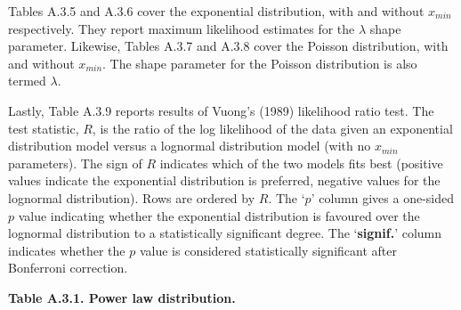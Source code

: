 Tables A.3.5 and A.3.6 cover the exponential distribution, with and
without \(x_{min}\) respectively. They report maximum likelihood
estimates for the \(\lambda\) shape parameter. Likewise, Tables A.3.7
and A.3.8 cover the Poisson distribution, with and without \(x_{min}\).
The shape parameter for the Poisson distribution is also termed
\(\lambda\).

Lastly, Table A.3.9 reports results of Vuong's (1989) likelihood ratio
test. The test statistic, \(R\), is the ratio of the log likelihood of
the data given an exponential distribution model versus a lognormal
distribution model (with no \(x_{min}\) parameters). The sign of \(R\)
indicates which of the two models fits best (positive values indicate
the exponential distribution is preferred, negative values for the
lognormal distribution). Rows are ordered by \(R\). The `\(p\)' column
gives a one-sided \(p\) value indicating whether the exponential
distribution is favoured over the lognormal distribution to a
statistically significant degree. The `\textbf{signif.}' column
indicates whether the \(p\) value is considered statistically
significant after Bonferroni correction.

\newpage

\textbf{Table A.3.1. Power law distribution.}

